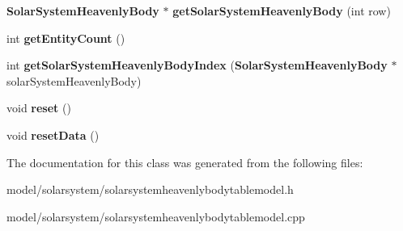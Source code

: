 \begin{DoxyCompactItemize}
\item 
{\bf \-Solar\-System\-Heavenly\-Body} $\ast$ {\bfseries get\-Solar\-System\-Heavenly\-Body} (int row)\label{da/d05/classSolarSystemHeavenlyBodyTableModel_a031620bee616572f2c7912e15e003679}

\item 
int {\bfseries get\-Entity\-Count} ()\label{da/d05/classSolarSystemHeavenlyBodyTableModel_aee4de0df36ed559c3b10441364f25f04}

\item 
int {\bfseries get\-Solar\-System\-Heavenly\-Body\-Index} ({\bf \-Solar\-System\-Heavenly\-Body} $\ast$solar\-System\-Heavenly\-Body)\label{da/d05/classSolarSystemHeavenlyBodyTableModel_ab78e8bfbf751fe828c432294017feb6b}

\item 
void {\bfseries reset} ()\label{da/d05/classSolarSystemHeavenlyBodyTableModel_ac050bbc34bd7907e54253ab86ee5ded0}

\item 
void {\bfseries reset\-Data} ()\label{da/d05/classSolarSystemHeavenlyBodyTableModel_ae1f3316c40beceba873ce66baca565b7}

\end{DoxyCompactItemize}


\-The documentation for this class was generated from the following files\-:\begin{DoxyCompactItemize}
\item 
model/solarsystem/solarsystemheavenlybodytablemodel.\-h\item 
model/solarsystem/solarsystemheavenlybodytablemodel.\-cpp\end{DoxyCompactItemize}
